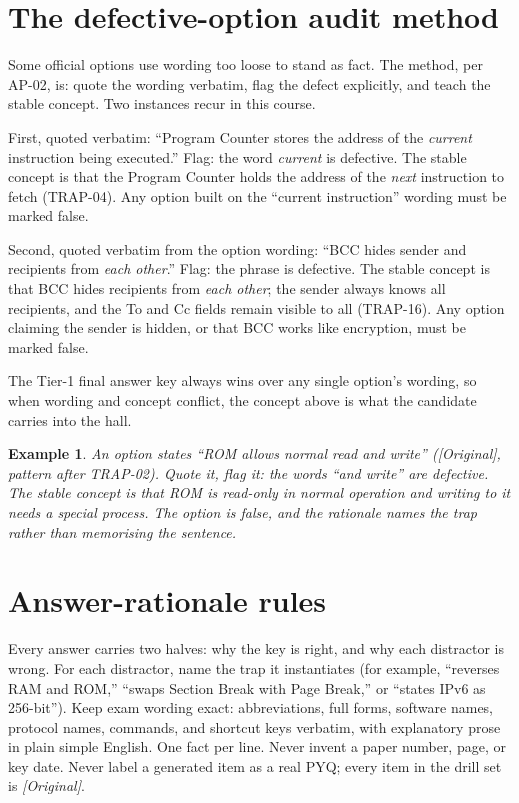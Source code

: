 \documentclass[11pt]{article}
\newtheorem{example}{Example}[section]
\begin{document}
\section{The defective-option audit method}
Some official options use wording too loose to stand as fact. The method,
per AP-02, is: quote the wording verbatim, flag the defect explicitly, and
teach the stable concept. Two instances recur in this course.

First, quoted verbatim: ``Program Counter stores the address of the
\textit{current} instruction being executed.'' Flag: the word \textit{current}
is defective. The stable concept is that the Program Counter holds the
address of the \textit{next} instruction to fetch (TRAP-04). Any option built
on the ``current instruction'' wording must be marked false.

Second, quoted verbatim from the option wording: ``BCC hides sender and
recipients from \textit{each other}.'' Flag: the phrase is defective. The
stable concept is that BCC hides recipients from \textit{each other}; the
sender always knows all recipients, and the To and Cc fields remain visible
to all (TRAP-16). Any option claiming the sender is hidden, or that BCC
works like encryption, must be marked false.

The Tier-1 final answer key always wins over any single option's wording, so
when wording and concept conflict, the concept above is what the candidate
carries into the hall.

\begin{example}
An option states ``ROM allows normal read and write''
(\textit{[Original]}, pattern after TRAP-02). Quote it, flag it: the words
``and write'' are defective. The stable concept is that ROM is read-only in
normal operation and writing to it needs a special process. The option is
false, and the rationale names the trap rather than memorising the sentence.
\end{example}

\section{Answer-rationale rules}
Every answer carries two halves: why the key is right, and why each
distractor is wrong. For each distractor, name the trap it instantiates (for
example, ``reverses RAM and ROM,'' ``swaps Section Break with Page Break,''
or ``states IPv6 as 256-bit''). Keep exam wording exact: abbreviations, full
forms, software names, protocol names, commands, and shortcut keys verbatim,
with explanatory prose in plain simple English. One fact per line. Never
invent a paper number, page, or key date. Never label a generated item as a
real PYQ; every item in the drill set is \textit{[Original]}.
\end{document}

